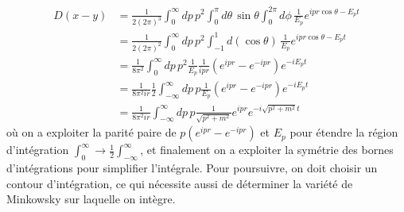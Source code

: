 \documentclass{article}
\numberwithin{equation}{section}
\begin{document}
\begin{align*}
        D(x - y) &= \frac{1}{2(2\pi)^{3}} \int_{0}^{\infty }dp\, p^2 \int_0^{\pi} d\theta\, \sin\theta \int_0^{2\pi}d\phi\,  \frac{1}{E_p}e^{i p r \cos\theta - E_{p}t}
        \\
                 &=  \frac{1}{2(2\pi)^{2}} \int_{0}^{\infty }dp\, p^2 \int_{-1}^{1}d(\cos \theta)\,  \frac{1}{E_p}e^{i p r\cos\theta  - E_{p}t} \\
                 &=   \frac{1}{8\pi^2} \int_{0}^{\infty }dp\, p^2   \frac{1}{E_p} \frac{1}{ipr}(e^{ipr} - e^{-ipr})e^{-iE_pt} \\
                 &=   \frac{1}{8\pi^2ir}\frac{1}{2}\int_{-\infty }^{\infty }dp\, p   \frac{1}{E_p}(e^{ipr} - e^{-ipr}) e^{-iE_pt} \\
                 &=   \frac{1}{8\pi^2ir}  \int_{-\infty }^{\infty }dp\, p   \frac{1}{\sqrt{p^2 + m^2}}e^{ipr} e^{-i\sqrt{p^2 + m^2}t} 
\end{align*}
où on a exploiter la parité paire de $p(e^{ipr} - e^{-ipr})$ et $E_{p}$ pour étendre la région d'intégration $\int_{0}^{\infty} \rightarrow \frac{1}{2}\int_{-\infty }^{\infty }$, 
et finalement on a exploiter la symétrie des bornes d'intégrations pour simplifier l'intégrale.
Pour poursuivre, on doit choisir un contour d'intégration, ce qui nécessite aussi de déterminer la variété de Minkowsky 
sur laquelle on intègre. 
\end{document}
